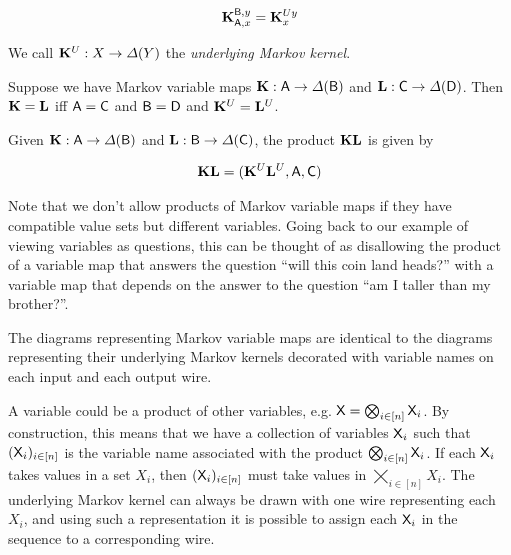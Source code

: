 \begin{align}
	\mathbf{K}_{\mathsf{A},x}^{\mathsf{B},y}  = \mathbf{K}^{U y}_x
\end{align}

We call $\mathbf{K}^U:X\to \Delta(Y)$ the \emph{underlying Markov kernel}.

Suppose we have Markov variable maps $\mathbf{K}:\mathsf{A}\to \Delta(\mathsf{B})$ and $\mathbf{L}:\mathsf{C}\to \Delta(\mathsf{D})$. Then $\mathbf{K}=\mathbf{L}$ iff $\mathsf{A}= \mathsf{C}$ and $\mathsf{B}= \mathsf{D}$ and $\mathbf{K}^U=\mathbf{L}^U$.

Given $\mathbf{K}:\mathsf{A}\to \Delta(\mathsf{B})$ and $\mathbf{L}:\mathsf{B}\to \Delta(\mathsf{C})$, the product $\mathbf{K}\mathbf{L}$ is given by

\begin{align}
	\mathbf{K}\mathbf{L} = (\mathbf{K}^U\mathbf{L}^U,\mathsf{A},\mathsf{C})
\end{align}

Note that we don't allow products of Markov variable maps if they have compatible value sets but different variables. Going back to our example of viewing variables as questions, this can be thought of as disallowing the product of a variable map that answers the question ``will this coin land heads?'' with a variable map that depends on the answer to the question ``am I taller than my brother?''.

The diagrams representing Markov variable maps are identical to the diagrams representing their underlying Markov kernels decorated with variable names on each input and each output wire. 


\begin{lemma}

\end{lemma}

A variable could be a product of other variables, e.g. $\mathsf{X}=\bigotimes_{i\in [n]} \mathsf{X}_i$. By construction, this means that we have a collection of variables $\mathsf{X}_i$ such that $(\mathsf{X}_i)_{i\in [n]}$ is the variable name associated with the product $\bigotimes_{i\in [n]} \mathsf{X}_i$. If each $\mathsf{X}_i$ takes values in a set $X_i$, then $(\mathsf{X}_i)_{i\in [n]}$ must take values in $\bigtimes_{i\in [n]} X_i$. The underlying Markov kernel can always be drawn with one wire representing each $X_i$, and using such a representation it is possible to assign each $\mathsf{X}_i$ in the sequence to a corresponding wire.


